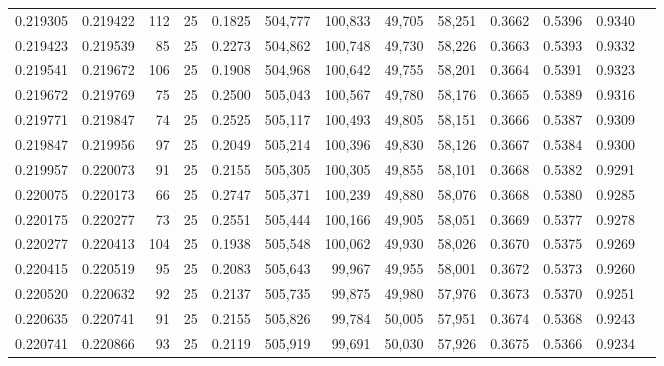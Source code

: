 \begin{tabular}{rrrrrrrrrrrrr}
0.219305 & 0.219422 &   112 &  25 &                                     0.1825 & 504,777 & 100,833 &  49,705 &  58,251 & 0.3662 & 0.5396 & 0.9340 \\
0.219423 & 0.219539 &    85 &  25 &                                     0.2273 & 504,862 & 100,748 &  49,730 &  58,226 & 0.3663 & 0.5393 & 0.9332 \\
0.219541 & 0.219672 &   106 &  25 &                                     0.1908 & 504,968 & 100,642 &  49,755 &  58,201 & 0.3664 & 0.5391 & 0.9323 \\
0.219672 & 0.219769 &    75 &  25 &                                     0.2500 & 505,043 & 100,567 &  49,780 &  58,176 & 0.3665 & 0.5389 & 0.9316 \\
0.219771 & 0.219847 &    74 &  25 &                                     0.2525 & 505,117 & 100,493 &  49,805 &  58,151 & 0.3666 & 0.5387 & 0.9309 \\
0.219847 & 0.219956 &    97 &  25 &                                     0.2049 & 505,214 & 100,396 &  49,830 &  58,126 & 0.3667 & 0.5384 & 0.9300 \\
0.219957 & 0.220073 &    91 &  25 &                                     0.2155 & 505,305 & 100,305 &  49,855 &  58,101 & 0.3668 & 0.5382 & 0.9291 \\
0.220075 & 0.220173 &    66 &  25 &                                     0.2747 & 505,371 & 100,239 &  49,880 &  58,076 & 0.3668 & 0.5380 & 0.9285 \\
0.220175 & 0.220277 &    73 &  25 &                                     0.2551 & 505,444 & 100,166 &  49,905 &  58,051 & 0.3669 & 0.5377 & 0.9278 \\
0.220277 & 0.220413 &   104 &  25 &                                     0.1938 & 505,548 & 100,062 &  49,930 &  58,026 & 0.3670 & 0.5375 & 0.9269 \\
0.220415 & 0.220519 &    95 &  25 &                                     0.2083 & 505,643 &  99,967 &  49,955 &  58,001 & 0.3672 & 0.5373 & 0.9260 \\
0.220520 & 0.220632 &    92 &  25 &                                     0.2137 & 505,735 &  99,875 &  49,980 &  57,976 & 0.3673 & 0.5370 & 0.9251 \\
0.220635 & 0.220741 &    91 &  25 &                                     0.2155 & 505,826 &  99,784 &  50,005 &  57,951 & 0.3674 & 0.5368 & 0.9243 \\
0.220741 & 0.220866 &    93 &  25 &                                     0.2119 & 505,919 &  99,691 &  50,030 &  57,926 & 0.3675 & 0.5366 & 0.9234 \\

\end{tabular}
